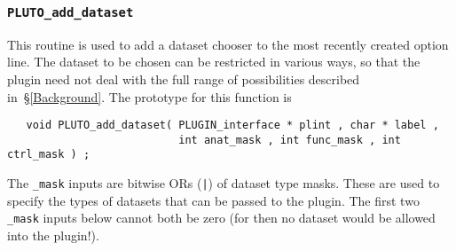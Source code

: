 \subsubsection{{\tt PLUTO\_add\_dataset}}
This routine is used to add a dataset chooser to the most recently created
option line.  The dataset to be chosen can be restricted in various ways,
so that the plugin need not deal with the full range of possibilities
described in~\S\ref{Background}.  The prototype for this function is
\begin{samepage}\begin{verbatim}
   void PLUTO_add_dataset( PLUGIN_interface * plint , char * label ,
                           int anat_mask , int func_mask , int ctrl_mask ) ;
\end{verbatim}\end{samepage}
The {\tt \_mask} inputs are bitwise ORs ({\tt |}) of dataset type masks.
These are used to specify the types of datasets that can be
passed to the plugin.  The first two {\tt \_mask} inputs below cannot both
be zero (for then no dataset would be allowed into the plugin!).
\renewcommand{\tb}[1]{\parbox[t]{5.2in}{\sloppy #1}}
